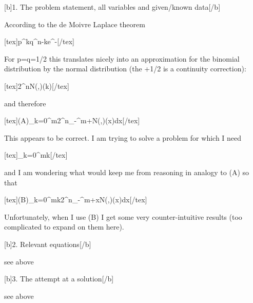 [b]1. The problem statement, all variables and given/known data[/b]

According to the de Moivre Laplace theorem

[tex]p^{k}q^{n-k}\approx{}e^{-}[/tex]

For p=q=1/2 this translates nicely into an approximation for the binomial distribution by the normal distribution (the +1/2 is a continuity correction):

[tex]\approx{}2^{n}N(,)(k)[/tex]

and therefore

[tex]\mbox{(A)}\quad \sum_{k=0}^{m}\approx{}2^{n}\int_{-\infty}^{m+}N(,)(x)dx[/tex]

This appears to be correct. I am trying to solve a problem for which I need

[tex]\sum_{k=0}^{m}k[/tex]

and I am wondering what would keep me from reasoning in analogy to (A) so that 

[tex]\mbox{(B)}\quad \sum_{k=0}^{m}k\approx{}2^{n}\int_{-\infty}^{m+}xN(,)(x)dx[/tex]

Unfortunately, when I use (B) I get some very counter-intuitive results (too complicated to expand on them here).

[b]2. Relevant equations[/b]

see above

[b]3. The attempt at a solution[/b]

see above
